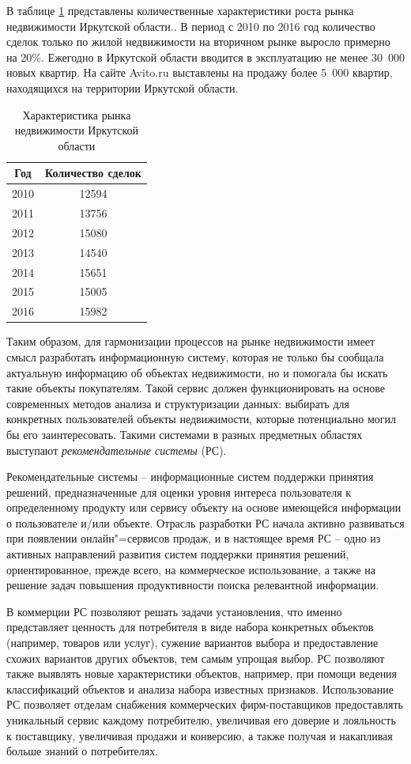 \documentclass[a4paper,14pt,openany,final]{extreport} %
\def\oldcaption{} \let\oldcaption=\caption
\def\caption{\stepcounter{captionsnum}\oldcaption}
\begin{document}
В таблице \ref{tab:market-irk} представлены количественные характеристики роста рынка недвижимости Иркутской области.. В период с 2010 по 2016 год количество сделок только по жилой недвижимости на вторичном рынке выросло примерно на 20\%. Ежегодно в Иркутской области вводится в эксплуатацию не менее 30~000 новых квартир.
На сайте Avito.ru выставлены на продажу более 5~000 квартир, находящихся на территории Иркутской области.

\begin{table}[htb]
  \caption{Характеристика рынка недвижимости Иркутской области}
  \label{tab:market-irk}
  \centering
  \begin{tabular}{|c|c|}
    \hline
Год &
      Количество сделок \\
    \hline
2010 &
12594 \\
2011 &
13756 \\
2012 &
15080\\
2013 &
14540\\
2014 &
15651\\
2015 &
15005\\
2016 &
       15982\\
    \hline
\end{tabular}
\end{table}

Таким образом, для гармонизации процессов на рынке недвижимости имеет смысл разработать информационную систему, которая не только бы сообщала актуальную информацию об объектах недвижимости, но и помогала бы искать такие объекты покупателям.  Такой сервис должен функционировать на основе современных методов анализа и структуризации данных: выбирать для конкретных пользователей объекты недвижимости, которые потенциально могил бы его заинтересовать.  Такими системами в разных предметных областях выступают \emph{рекомендательные системы} (РС).

Рекомендательные системы \cite{b1} -- информационные систем поддержки принятия решений, предназначенные для оценки уровня интереса пользователя к определенному продукту или сервису объекту на основе имеющейся информации о пользователе и/или объекте. Отрасль разработки РС начала активно развиваться при появлении онлайн"=сервисов продаж, и в настоящее время РС – одно из активных направлений развития систем поддержки принятия решений, ориентированное, прежде всего, на коммерческое использование, а также на решение задач повышения продуктивности поиска релевантной информации.

В коммерции РС позволяют решать задачи установления, что именно представляет ценность для потребителя в виде набора конкретных объектов (например, товаров или услуг), сужение вариантов выбора и предоставление схожих вариантов других объектов, тем самым упрощая выбор. РС позволяют также выявлять новые характеристики объектов, например, при помощи ведения классификаций объектов и анализа набора известных признаков. Использование РС позволяет отделам снабжения коммерческих фирм-поставщиков предоставлять уникальный сервис каждому потребителю, увеличивая его доверие и лояльность к поставщику, увеличивая продажи и конверсию, а также получая и накапливая больше знаний о потребителях.
\end{document}
